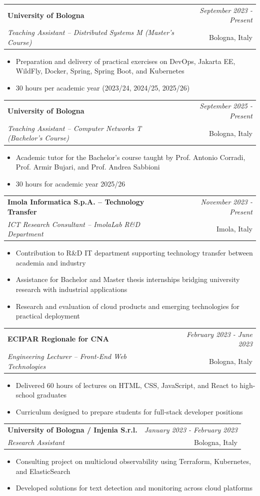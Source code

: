 \documentclass[a4paper,11pt]{article}
\makeatletter
\newcommand{\resumeSubheading}[4]{
\vspace{0.5mm}\item[]
    \begin{tabular*}{0.98\textwidth}[t]{l@{\extracolsep{\fill}}r}
        \textbf{#1} & \textit{\footnotesize{#4}} \\
        \textit{\footnotesize{#3}} &  \footnotesize{#2}\\
    \end{tabular*}
    \vspace{-2.4mm}
}
\newcommand{\resumeItemListStart}{\begin{itemize}[leftmargin=*,labelsep=1mm,itemsep=0.5mm]}
\newcommand{\resumeItemListEnd}{\end{itemize}\vspace{-2mm}}
\makeatother
\begin{document}
\resumeSubheading
{University of Bologna}{Bologna, Italy}
{Teaching Assistant -- Distributed Systems M (Master's Course)}{September 2023 - Present}
\resumeItemListStart
  \item Preparation and delivery of practical exercises on DevOps, Jakarta EE, WildFly, Docker, Spring, Spring Boot, and Kubernetes
  \item 30 hours per academic year (2023/24, 2024/25, 2025/26)
\resumeItemListEnd

\resumeSubheading
{University of Bologna}{Bologna, Italy}
{Teaching Assistant -- Computer Networks T (Bachelor's Course)}{September 2025 - Present}
\resumeItemListStart
  \item Academic tutor for the Bachelor's course taught by Prof. Antonio Corradi, Prof. Armir Bujari, and Prof. Andrea Sabbioni
  \item 30 hours for academic year 2025/26
\resumeItemListEnd

\resumeSubheading
{Imola Informatica S.p.A. -- Technology Transfer}{Imola, Italy}
{ICT Research Consultant -- ImolaLab R\&D Department}{November 2023 - Present}
\resumeItemListStart
  \item Contribution to R\&D IT department supporting technology transfer between academia and industry
  \item Assistance for Bachelor and Master thesis internships bridging university research with industrial applications
  \item Research and evaluation of cloud products and emerging technologies for practical deployment
\resumeItemListEnd

\resumeSubheading
{ECIPAR Regionale for CNA}{Bologna, Italy}
{Engineering Lecturer -- Front-End Web Technologies}{February 2023 - June 2023}
\resumeItemListStart
  \item Delivered 60 hours of lectures on HTML, CSS, JavaScript, and React to high-school graduates
  \item Curriculum designed to prepare students for full-stack developer positions
\resumeItemListEnd

\resumeSubheading
{University of Bologna / Injenia S.r.l.}{Bologna, Italy}
{Research Assistant}{January 2023 - February 2023}
\resumeItemListStart
  \item Consulting project on multicloud observability using Terraform, Kubernetes, and ElasticSearch
  \item Developed solutions for text detection and monitoring across cloud platforms
\resumeItemListEnd
\end{document}
